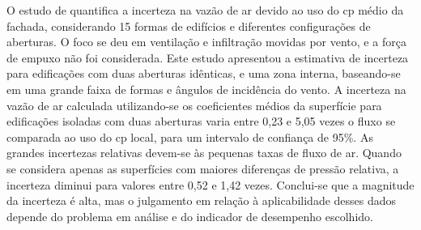 \documentclass[brazil,hardcopy,openany]{ufscthesis} %
\begin{document}
O estudo de  quantifica a incerteza na vazão de ar devido ao uso do \acrshort{cp} médio da fachada, considerando 15 formas de edifícios e diferentes configurações de aberturas. O foco se deu em ventilação e infiltração movidas por vento, e a força de empuxo não foi considerada. Este estudo apresentou a estimativa de incerteza para edificações com duas aberturas idênticas, e uma zona interna, baseando-se em uma grande faixa de formas e ângulos de incidência do vento. A incerteza na vazão de ar calculada utilizando-se os coeficientes médios da superfície para edificações isoladas com duas aberturas varia entre 0,23 e 5,05 vezes o fluxo se comparada ao uso do \acrshort{cp} local, para um intervalo de confiança de 95\%. As grandes incertezas relativas devem-se às pequenas taxas de fluxo de ar. Quando se considera apenas as superfícies com maiores diferenças de pressão relativa, a incerteza diminui para  valores entre 0,52 e 1,42 vezes. Conclui-se que a magnitude da incerteza é alta, mas o julgamento em relação à aplicabilidade desses dados depende do problema em análise e do indicador de desempenho escolhido.
\end{document}

